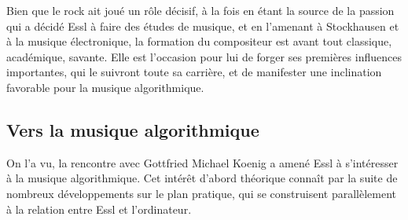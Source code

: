 \documentclass[a4paper,12pt]{article}
\begin{document}
Bien que le rock ait joué un rôle décisif, à la fois en étant la source de la passion qui a décidé Essl à faire des études de musique, et en l'amenant à Stockhausen et à la musique électronique, la formation du compositeur est avant tout classique, académique, savante. Elle est l'occasion pour lui de forger ses premières influences importantes, qui le suivront toute sa carrière, et de manifester une inclination favorable pour la musique algorithmique.

\subsection{Vers la musique algorithmique}
\label{parcoursalgo}

On l'a vu, la rencontre avec Gottfried Michael Koenig a amené Essl à s'intéresser à la musique algorithmique. Cet intérêt d'abord théorique connaît par la suite de nombreux développements sur le plan pratique, qui se construisent parallèlement à la relation entre Essl et l'ordinateur.
\end{document}

